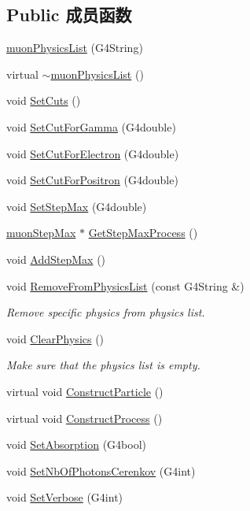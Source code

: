 \subsection*{Public 成员函数}
\begin{DoxyCompactItemize}
\item 
\hyperlink{classmuonPhysicsList_aec1adc0f09839b739713b95b60a3433c}{muon\+Physics\+List} (G4\+String)
\item 
virtual \hyperlink{classmuonPhysicsList_aadc5d4467f9fa4220be83462d94e28a4}{$\sim$muon\+Physics\+List} ()
\item 
void \hyperlink{classmuonPhysicsList_ae567a51ca4aff57c7148bb3886bff6d0}{Set\+Cuts} ()
\item 
void \hyperlink{classmuonPhysicsList_a462e709c365cb2c502eba1c71fb24d06}{Set\+Cut\+For\+Gamma} (G4double)
\item 
void \hyperlink{classmuonPhysicsList_a0d5e15f23de27e9ed9876eb9fb481b7f}{Set\+Cut\+For\+Electron} (G4double)
\item 
void \hyperlink{classmuonPhysicsList_a610582e1c0d233f2c5c0914189547d08}{Set\+Cut\+For\+Positron} (G4double)
\item 
void \hyperlink{classmuonPhysicsList_a43f30e66e8518d33040777262bbc829f}{Set\+Step\+Max} (G4double)
\item 
\hyperlink{classmuonStepMax}{muon\+Step\+Max} $\ast$ \hyperlink{classmuonPhysicsList_a673fde0059508d78547a84db91971ce9}{Get\+Step\+Max\+Process} ()
\item 
void \hyperlink{classmuonPhysicsList_a9d96538f586114bd672f975658527527}{Add\+Step\+Max} ()
\item 
void \hyperlink{classmuonPhysicsList_aaba742da0c9dc44a6498bfc804e284eb}{Remove\+From\+Physics\+List} (const G4\+String \&)
\begin{DoxyCompactList}\small\item\em Remove specific physics from physics list. \end{DoxyCompactList}\item 
void \hyperlink{classmuonPhysicsList_a4a34c6141040c0d5bd34396df7d10ff3}{Clear\+Physics} ()
\begin{DoxyCompactList}\small\item\em Make sure that the physics list is empty. \end{DoxyCompactList}\item 
virtual void \hyperlink{classmuonPhysicsList_aefb2f75ee5958cfcf78b50c479523703}{Construct\+Particle} ()
\item 
virtual void \hyperlink{classmuonPhysicsList_aac0f8e3bd5e0509f96613e150554d06e}{Construct\+Process} ()
\item 
void \hyperlink{classmuonPhysicsList_afe6f5f4bcf37f721cd821753ace0b06d}{Set\+Absorption} (G4bool)
\item 
void \hyperlink{classmuonPhysicsList_abf3b923807c3112086ea15a698d5666b}{Set\+Nb\+Of\+Photons\+Cerenkov} (G4int)
\item 
void \hyperlink{classmuonPhysicsList_a459c2902a6bf45261961a67954324c9b}{Set\+Verbose} (G4int)
\end{DoxyCompactItemize}
